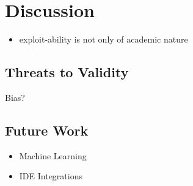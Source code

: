 \section{Discussion}
\label{sec:discussion}

\begin{itemize}
    \item exploit-ability is not only of academic nature
\end{itemize}


\subsection{Threats to Validity}

Bias?


\subsection{Future Work}

\begin{itemize}
    \item Machine Learning
    \item IDE Integrations
\end{itemize}
